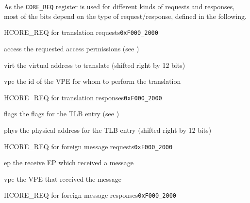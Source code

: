 \noindent As the \texttt{CORE\_REQ} register is used for different kinds of requests and responses,
most of the bits depend on the type of request/response, defined in the following.

\begin{register}{H}{CORE\_REQ for translation requests}{\texttt{0xF000\_2000}}
  \regnewline%
  \begin{regdesc}\begin{reglist}
    \item[access] the requested access permissions (see )
    \item[virt] the virtual address to translate (shifted right by 12 bits)
    \item[vpe] the id of the VPE for whom to perform the translation
  \end{reglist}\end{regdesc}
\end{register}

\begin{register}{H}{CORE\_REQ for translation responses}{\texttt{0xF000\_2000}}
  \regnewline%
  \begin{regdesc}\begin{reglist}
    \item[flags] the flags for the TLB entry (see )
    \item[phys] the physical address for the TLB entry (shifted right by 12 bits)
  \end{reglist}\end{regdesc}
\end{register}
\extend{}

\begin{register}{H}{CORE\_REQ for foreign message requests}{\texttt{0xF000\_2000}}
  \regnewline%
  \begin{regdesc}\begin{reglist}
    \item[ep] the receive EP which received a message
    \item[vpe] the VPE that received the message
  \end{reglist}\end{regdesc}
\end{register}

\begin{register}{H}{CORE\_REQ for foreign message responses}{\texttt{0xF000\_2000}}
  \regnewline%
\end{register}
\extend{}

